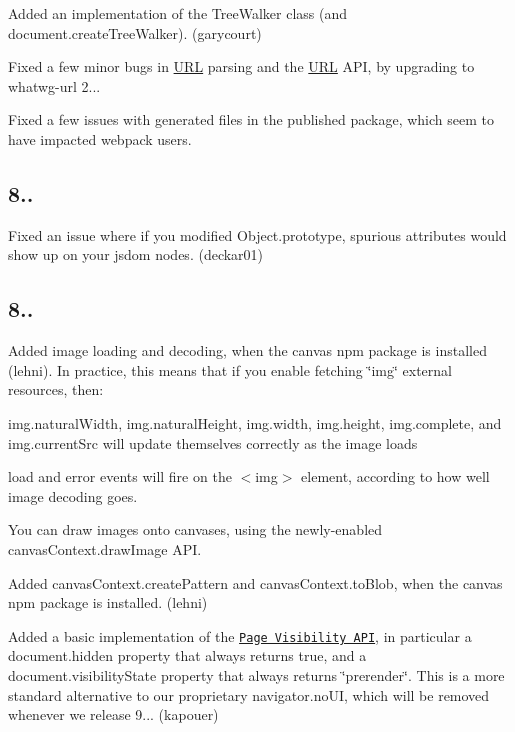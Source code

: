 \begin{DoxyItemize}
\item Added an implementation of the {\ttfamily Tree\+Walker} class (and {\ttfamily document.\+create\+Tree\+Walker}). (garycourt)
\item Fixed a few minor bugs in \mbox{\hyperlink{namespace_u_r_l}{U\+RL}} parsing and the {\ttfamily \mbox{\hyperlink{namespace_u_r_l}{U\+RL}}} A\+PI, by upgrading to {\ttfamily whatwg-\/url} 2...
\item Fixed a few issues with generated files in the published package, which seem to have impacted webpack users.
\end{DoxyItemize}

\subsection*{8..}


\begin{DoxyItemize}
\item Fixed an issue where if you modified {\ttfamily Object.\+prototype}, spurious attributes would show up on your jsdom nodes. (deckar01)
\end{DoxyItemize}

\subsection*{8..}


\begin{DoxyItemize}
\item Added image loading and decoding, when the {\ttfamily canvas} npm package is installed (lehni). In practice, this means that if you enable fetching {\ttfamily \char`\"{}img\char`\"{}} external resources, then\+:
\begin{DoxyItemize}
\item {\ttfamily img.\+natural\+Width}, {\ttfamily img.\+natural\+Height}, {\ttfamily img.\+width}, {\ttfamily img.\+height}, {\ttfamily img.\+complete}, and {\ttfamily img.\+current\+Src} will update themselves correctly as the image loads
\item {\ttfamily load} and {\ttfamily error} events will fire on the {\ttfamily $<$img$>$} element, according to how well image decoding goes.
\item You can draw images onto canvases, using the newly-\/enabled {\ttfamily canvas\+Context.\+draw\+Image} A\+PI.
\end{DoxyItemize}
\item Added {\ttfamily canvas\+Context.\+create\+Pattern} and {\ttfamily canvas\+Context.\+to\+Blob}, when the {\ttfamily canvas} npm package is installed. (lehni)
\item Added a basic implementation of the \href{https://w3c.github.io/page-visibility/}{\tt Page Visibility A\+PI}, in particular a {\ttfamily document.\+hidden} property that always returns {\ttfamily true}, and a {\ttfamily document.\+visibility\+State} property that always returns {\ttfamily \char`\"{}prerender\char`\"{}}. This is a more standard alternative to our proprietary {\ttfamily navigator.\+no\+UI}, which will be removed whenever we release 9... (kapouer)
\end{DoxyItemize}

